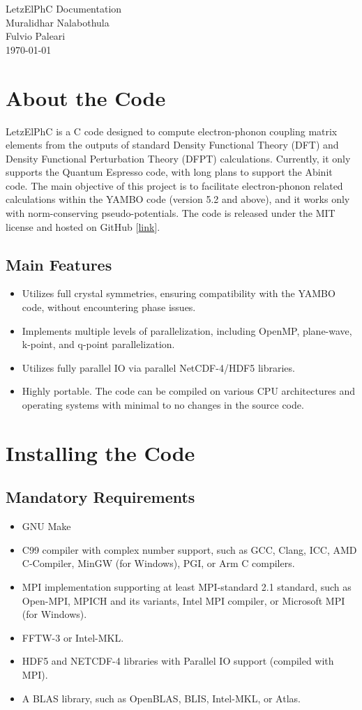 \documentclass[12pt,twoside,openany]{book}
\renewcommand{\sectionmark}[1]{\markright{\thesection\ #1}}
\newcommand{\prefrontmatter}{\thispagestyle{empty}
   \begin{center}
        \huge\projecttitle\\
        \vspace{10pt}
        \large{Muralidhar Nalabothula}\\
        \vspace{5pt}
        \large{Fulvio Paleari}\\
        \vspace{10pt}
        \small{\projectmonth}\\
   \end{center}
    \clearpage
   \thispagestyle{empty}
}
\def\projecttitle{LetzElPhC Documentation}
\def\projectmonth{\today}
\begin{document}
\prefrontmatter
{}
\renewcommand{\sectionmark}[1]{\markright{#1}}
\addtolength{\parskip}{-\baselineskip}  
\tableofcontents
\addtolength{\parskip}{\baselineskip}
\renewcommand{\sectionmark}[1]{\markright{\thesection\ #1}}
\clearpage
%
%
%
%
%
%
%
%
%
%
%
\chapter{About the Code}
LetzElPhC is a C code designed to compute electron-phonon coupling matrix elements from the outputs of standard Density Functional Theory (DFT) and Density Functional Perturbation Theory (DFPT) calculations. 
Currently, it only supports the Quantum Espresso code, with long plans to support the Abinit code. 
The main objective of this project is to facilitate electron-phonon related calculations 
within the YAMBO code (version 5.2 and above), and it works only with norm-conserving pseudo-potentials. 
The code is released under the MIT license and hosted on GitHub [\href{https://github.com/muralidhar-nalabothula/LetzElPhC}{link}].
\section{Main Features}
\begin{itemize}
\item Utilizes full crystal symmetries, ensuring compatibility with the YAMBO code, without encountering phase issues.
\item Implements multiple levels of parallelization, including OpenMP, plane-wave, k-point, and q-point parallelization.
\item Utilizes fully parallel IO via parallel NetCDF-4/HDF5 libraries.
\item Highly portable. The code can be compiled on various CPU architectures and operating systems with minimal to no changes in the source code.
\end{itemize}
\chapter{Installing the Code}
\section{Mandatory Requirements}
\begin{itemize}
\item GNU Make
\item C99 compiler with complex number support, such as GCC, Clang, ICC, AMD C-Compiler, MinGW (for Windows), PGI, or Arm C compilers.
\item MPI implementation supporting at least MPI-standard 2.1 standard, such as Open-MPI, MPICH and its variants, Intel MPI compiler, or Microsoft MPI (for Windows).
\item FFTW-3 or Intel-MKL.
\item HDF5 and NETCDF-4 libraries with Parallel IO support (compiled with MPI).
\item A BLAS library, such as OpenBLAS, BLIS, Intel-MKL, or Atlas.
\end{itemize}
\end{document}
